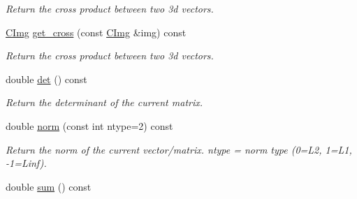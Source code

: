 \begin{DoxyCompactItemize}
\begin{DoxyCompactList}\small\item\em Return the cross product between two 3d vectors. \item\end{DoxyCompactList}\item 
\hypertarget{structcimg__library_1_1_c_img_acffeed1150aa359e2e760beb50053e7b}{
\hyperlink{structcimg__library_1_1_c_img}{CImg} \hyperlink{structcimg__library_1_1_c_img_acffeed1150aa359e2e760beb50053e7b}{get\_\-cross} (const \hyperlink{structcimg__library_1_1_c_img}{CImg} \&img) const }
\label{structcimg__library_1_1_c_img_acffeed1150aa359e2e760beb50053e7b}

\begin{DoxyCompactList}\small\item\em Return the cross product between two 3d vectors. \item\end{DoxyCompactList}\item 
\hypertarget{structcimg__library_1_1_c_img_a4909523f4b0c661e3e23b8805c9ac5c2}{
double \hyperlink{structcimg__library_1_1_c_img_a4909523f4b0c661e3e23b8805c9ac5c2}{det} () const }
\label{structcimg__library_1_1_c_img_a4909523f4b0c661e3e23b8805c9ac5c2}

\begin{DoxyCompactList}\small\item\em Return the determinant of the current matrix. \item\end{DoxyCompactList}\item 
\hypertarget{structcimg__library_1_1_c_img_a489a283b835a73074b2db91000147249}{
double \hyperlink{structcimg__library_1_1_c_img_a489a283b835a73074b2db91000147249}{norm} (const int ntype=2) const }
\label{structcimg__library_1_1_c_img_a489a283b835a73074b2db91000147249}

\begin{DoxyCompactList}\small\item\em Return the norm of the current vector/matrix. {\ttfamily ntype} = norm type (0=L2, 1=L1, -\/1=Linf). \item\end{DoxyCompactList}\item 
\hypertarget{structcimg__library_1_1_c_img_acd9c40e2d6889b9eae6b330a5045371d}{
double \hyperlink{structcimg__library_1_1_c_img_acd9c40e2d6889b9eae6b330a5045371d}{sum} () const }
\label{structcimg__library_1_1_c_img_acd9c40e2d6889b9eae6b330a5045371d}


\end{DoxyCompactItemize}
